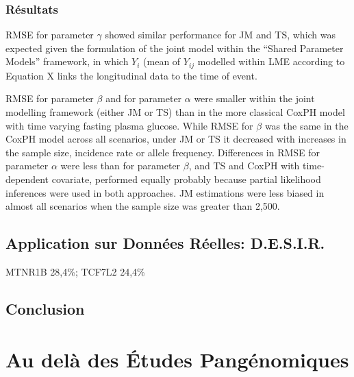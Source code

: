 \documentclass[11pt]{article} %
\begin{document}
\par{}

\subsubsection{Résultats}
\par{RMSE for parameter $\gamma$ showed similar performance for JM and TS, which was expected given the formulation of the joint model within the ``Shared Parameter Models'' framework, in which $Y_i$ (mean of $Y_{ij}$ modelled within LME according to Equation X links the longitudinal data to the time of event.}

\par{}

\par{RMSE for parameter $\beta$ and for parameter $\alpha$ were smaller within the joint modelling framework (either JM or TS) than in the more classical CoxPH model with time varying fasting plasma glucose. While RMSE for $\beta$ was the same in the CoxPH model across all scenarios, under JM or TS it decreased with increases in the sample size, incidence rate or allele frequency. Differences in RMSE for parameter $\alpha$ were less than for parameter $\beta$, and TS and CoxPH with time-dependent covariate, performed equally probably because partial likelihood inferences were used in both approaches. JM estimations were less biased in almost all scenarios when the sample size was greater than 2,500.}

\par{}

\par{}

\par{}

\subsection{Application sur Données Réelles: D.E.S.I.R.}
\par{}

\par{MTNR1B 28,4\%; TCF7L2 24,4\%}

\subsection{Conclusion}
\par{}

\section{Au delà des \'Etudes Pangénomiques}
\end{document}
